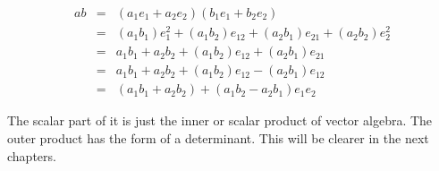 \begin{eqnarray}
ab & = & (a_1 e_1 + a_2 e_2) (b_1 e_1 + b_2 e_2) \\
& = & (a_1 b_1) e_1^2 + (a_1 b_2) e_{12} + (a_2 b_1) e_{21} + (a_2 b _2) e_2^2 \\
& = & a_1 b_1 + a_2 b_2 + (a_1 b_2) e_{12} + (a_2 b_1) e_{21} \\
& = & a_1 b_1 + a_2 b_2 + (a_1 b_2) e_{12} - (a_2 b_1) e_{12} \\
& = & (a_1 b_1 + a_2 b_2) + (a_1 b_2 - a_2 b_1) e_1 e_2 
\end{eqnarray}

The scalar part of it is just the inner or scalar product of vector algebra. The outer product has the form of a determinant. This will be clearer in the next chapters.























